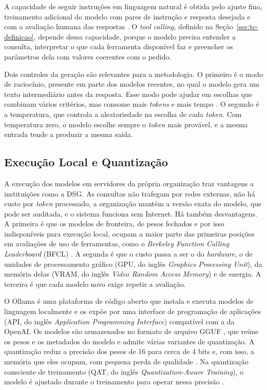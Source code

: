 A capacidade de seguir instruções em linguagem natural é obtida pelo ajuste fino, treinamento adicional do modelo com pares de instrução e resposta desejada e com a avaliação humana das respostas \cite{ouyang2022training}. O \textit{tool calling}, definido na Seção~\ref{sec:tc-definicao}, depende dessa capacidade, porque o modelo precisa entender a consulta, interpretar o que cada ferramenta disponível faz e preencher os parâmetros dela com valores coerentes com o pedido.

Dois controles da geração são relevantes para a metodologia. O primeiro é o modo de raciocínio, presente em parte dos modelos recentes, no qual o modelo gera um texto intermediário antes da resposta. Esse modo pode ajudar em escolhas que combinam vários critérios, mas consome mais \textit{tokens} e mais tempo \cite{qwen2025qwen3}. O segundo é a temperatura, que controla a aleatoriedade na escolha de cada \textit{token}. Com temperatura zero, o modelo escolhe sempre o \textit{token} mais provável, e a mesma entrada tende a produzir a mesma saída.

\subsection{Execução Local e Quantização}
\label{sec:execucao-local}

A execução dos modelos em servidores da própria organização traz vantagens a instituições como a DSG. As consultas não trafegam por redes externas, não há custo por \textit{token} processado, a organização mantém a versão exata do modelo, que pode ser auditada, e o sistema funciona sem Internet. Há também desvantagens. A primeira é que os modelos de fronteira, de pesos fechados e por isso indisponíveis para execução local, ocupam a maior parte das primeiras posições em avaliações de uso de ferramentas, como o \textit{Berkeley Function Calling Leaderboard} (BFCL) \cite{patil2025berkeley}. A segunda é que o custo passa a ser o do \textit{hardware}, o de unidades de processamento gráfico (GPU, do inglês \textit{Graphics Processing Unit}), da memória delas (VRAM, do inglês \textit{Video Random Access Memory}) e de energia. A terceira é que cada modelo novo exige repetir a avaliação.

O Ollama \cite{ollama2023} é uma plataforma de código aberto que instala e executa modelos de linguagem localmente e os expõe por uma interface de programação de aplicações (API, do inglês \textit{Application Programming Interface}) compatível com a da OpenAI. Os modelos são armazenados no formato de arquivo GGUF \cite{gguf2023}, que reúne os pesos e os metadados do modelo e admite várias variantes de quantização. A quantização reduz a precisão dos pesos de 16 para cerca de 4 bits e, com isso, a memória que eles ocupam, com pequena perda de qualidade \cite{frantar2022gptq}. Na quantização consciente de treinamento (QAT, do inglês \textit{Quantization-Aware Training}), o modelo é ajustado durante o treinamento para operar nessa precisão \cite{google2026gemma4qat}.

